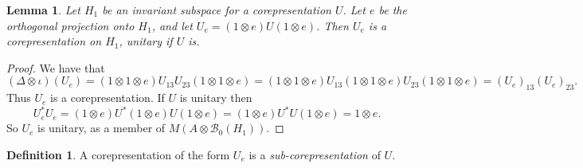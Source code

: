 \documentclass[twoside,a4paper,12pt]{article}
\theoremstyle{plain}
\newtheorem{lemma}[proposition]{Lemma}
\theoremstyle{definition}
\newtheorem{definition}[proposition]{Definition}
\newcommand{\mc}{\mathcal}
\begin{document}
\begin{lemma}
Let $H_1$ be an invariant subspace for a corepresentation $U$.  Let $e$ be the
orthogonal projection onto $H_1$, and let $U_e = (1\otimes e)U(1\otimes e)$.
Then $U_e$ is a corepresentation on $H_1$, unitary if $U$ is.
\end{lemma}
\begin{proof}
We have that
\[ (\Delta\otimes\iota)(U_e)
= (1\otimes 1\otimes e)U_{13} U_{23}(1\otimes 1\otimes e)
= (1\otimes 1\otimes e)U_{13} (1\otimes 1\otimes e) U_{23}(1\otimes 1\otimes e)
= (U_e)_{13} (U_e)_{23}. \]
Thus $U_e$ is a corepresentation.  If $U$ is unitary then
\[ U_e^* U_e = (1\otimes e)U^*(1\otimes e)U (1\otimes e)
= (1\otimes e)U^*U (1\otimes e) = 1\otimes e. \]
So $U_e$ is unitary, as a member of $M(A\otimes\mc B_0(H_1))$.
\end{proof}

\begin{definition}
A corepresentation of the form $U_e$ is a \emph{sub-corepresentation} of $U$.
\end{definition}
\end{document}
